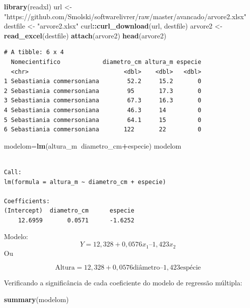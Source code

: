 \documentclass[12pt,brazil,oneside]{book}
\newenvironment{Shaded}{\begin{snugshade}}{\end{snugshade}}
\newcommand{\KeywordTok}[1]{\textcolor[rgb]{0.13,0.29,0.53}{\textbf{#1}}}
\newcommand{\NormalTok}[1]{#1}
\newcommand{\OperatorTok}[1]{\textcolor[rgb]{0.81,0.36,0.00}{\textbf{#1}}}
\newcommand{\StringTok}[1]{\textcolor[rgb]{0.31,0.60,0.02}{#1}}
\begin{document}
\begin{Shaded}
\begin{Highlighting}[]
\KeywordTok{library}\NormalTok{(readxl)}
\NormalTok{url <-}\StringTok{ "https://github.com/Smolski/softwarelivrer/raw/master/avancado/arvore2.xlsx"}
\NormalTok{destfile <-}\StringTok{ "arvore2.xlsx"}
\NormalTok{curl}\OperatorTok{::}\KeywordTok{curl_download}\NormalTok{(url, destfile)}
\NormalTok{arvore2 <-}\StringTok{ }\KeywordTok{read_excel}\NormalTok{(destfile)}
\KeywordTok{attach}\NormalTok{(arvore2)}
\KeywordTok{head}\NormalTok{(arvore2)}
\end{Highlighting}
\end{Shaded}

\begin{verbatim}
# A tibble: 6 x 4
  Nomecientifico            diametro_cm altura_m especie
  <chr>                           <dbl>    <dbl>   <dbl>
1 Sebastiania commersoniana        52.2     15.2       0
2 Sebastiania commersoniana        95       17.3       0
3 Sebastiania commersoniana        67.3     16.3       0
4 Sebastiania commersoniana        46.3     14         0
5 Sebastiania commersoniana        64.1     15         0
6 Sebastiania commersoniana       122       22         0
\end{verbatim}

\begin{Shaded}
\begin{Highlighting}[]
\NormalTok{modelom=}\KeywordTok{lm}\NormalTok{(altura_m}\OperatorTok{~}\NormalTok{diametro_cm}\OperatorTok{+}\NormalTok{especie) }
\NormalTok{modelom}
\end{Highlighting}
\end{Shaded}

\begin{verbatim}

Call:
lm(formula = altura_m ~ diametro_cm + especie)

Coefficients:
(Intercept)  diametro_cm      especie  
    12.6959       0.0571      -1.6252  
\end{verbatim}

Modelo: \[
Y = 12,328 + 0,0576 x_1 – 1,423 x_2
\] Ou

\[
\text{Altura} = 12,328 + 0,0576\text{diâmetro} – 1,423\text{espécie}
\]

Verificando a significância de cada coeficiente do modelo de regressão
múltipla:

\begin{Shaded}
\begin{Highlighting}[]
\KeywordTok{summary}\NormalTok{(modelom)}
\end{Highlighting}
\end{Shaded}
\end{document}
